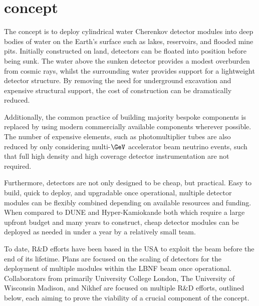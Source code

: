 \section{\chips concept} %
\label{sec:chips_concept} %

The \chips concept is to deploy cylindrical water Cherenkov detector modules into deep bodies of
water on the Earth's surface such as lakes, reservoirs, and flooded mine pits. Initially
constructed on land, \chips detectors can be floated into position before being sunk. The water
above the sunken detector provides a modest overburden from cosmic rays, whilst the surrounding
water provides support for a lightweight detector structure. By removing the need for underground
excavation and expensive structural support, the cost of construction can be dramatically reduced.

Additionally, the common practice of building majority bespoke components is replaced by using
modern commercially available components wherever possible. The number of expensive elements, such
as photomultiplier tubes are also reduced by only considering multi-$\GeV$ accelerator beam
neutrino events, such that full high density and high coverage detector instrumentation are not
required.

Furthermore, \chips detectors are not only designed to be cheap, but practical. Easy to build,
quick to deploy, and upgradable once operational, multiple detector modules can be flexibly
combined depending on available resources and funding. When compared to DUNE and Hyper-Kamiokande
both which require a large upfront budget and many years to construct, cheap \chips detector
modules can be deployed as needed in under a year by a relatively small team.

To date, \chips R\&D efforts have been based in the USA to exploit the \numi beam before the end
of its lifetime. Plans are focused on the scaling of \chips detectors for the deployment of
multiple modules within the LBNF beam once operational. Collaborators from primarily University
College London, The University of Wisconsin Madison, and Nikhef are focused on multiple R\&D
efforts, outlined below, each aiming to prove the viability of a crucial component of the \chips
concept.

